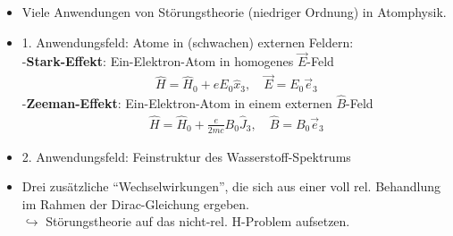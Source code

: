 \documentclass[10pt,article,colorback,accentcolor=tud9d]{scrartcl}
\begin{document}
\begin{itemize}
	\item Viele Anwendungen von Störungstheorie (niedriger Ordnung) in Atomphysik. 
  \item 1. Anwendungsfeld: Atome in (schwachen) externen Feldern:\\
    -\textbf{Stark-Effekt}: Ein-Elektron-Atom in homogenes $\vec{E}$-Feld
      \begin{align}
      \hat{H}=\hat{H}_0+eE_0\hat{x}_3,\quad \vec{E}=E_0\vec{e}_3
      \end{align}
    -\textbf{Zeeman-Effekt}: Ein-Elektron-Atom in einem externen $\hat{B}$-Feld
      \begin{align}
      \hat{H}=\hat{H}_0+\frac{e}{2mc}B_0\hat{J}_3,\quad \hat{B}=B_0\vec{e}_3
      \end{align}
  \item 2. Anwendungsfeld: Feinstruktur des Wasserstoff-Spektrums
  \item Drei zusätzliche "`Wechselwirkungen"', die sich aus einer voll rel. Behandlung im Rahmen der Dirac-Gleichung ergeben.\\
    $\hookrightarrow$ Störungstheorie auf das nicht-rel. H-Problem aufsetzen.
\end{itemize}
\end{document}
